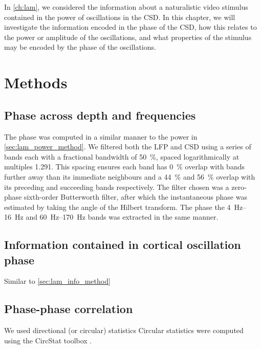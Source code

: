 
In \autoref{ch:lam}, we considered the information about a naturalistic video stimulus contained in the power of oscillations in the \ac{CSD}.
In this chapter, we will investigate the information encoded in the phase of the \ac{CSD}, how this relates to the power or amplitude of the oscillations, and what properties of the stimulus may be encoded by the phase of the oscillations.


\section{Methods}


\subsection{Phase across depth and frequencies}
\label{sec:lam_phase_method}

The phase was computed in a similar manner to the power in \autoref{sec:lam_power_method}.
We filtered both the \ac{LFP} and \ac{CSD} using a series of bands each with a fractional bandwidth of \SI{50}{\percent}, spaced logarithmically at multiples \num{1.291}.
This spacing ensures each band has \SI{0}{\percent} overlap with bands further away than its immediate neighbours and a \SI{44}{\percent} and \SI{56}{\percent} overlap with its preceding and succeeding bands respectively.
The filter chosen was a zero-phase sixth-order Butterworth filter, after which the instantaneous phase was estimated by taking the angle of the Hilbert transform.
The phase the \SIrange{4}{16}{Hz} and \SIrange{60}{170}{Hz} bands was extracted in the same manner.


\subsection{Information contained in cortical oscillation phase}

Similar to \autoref{sec:lam_info_method}


\subsection{Phase-phase correlation}

We used directional (or circular) statistics
Circular statistics were computed using the CircStat toolbox \citep{Berens2009}.


